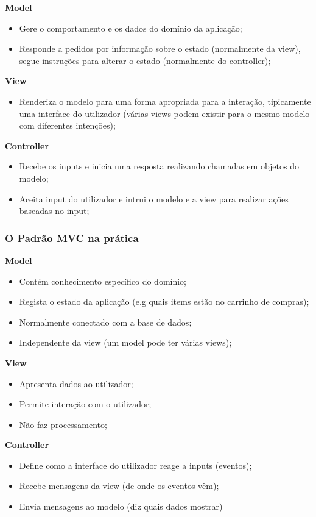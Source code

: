 \documentclass{article}
\begin{document}
\begin{flushleft}
  \textbf{Model}
  \begin{itemize}
    \item Gere o comportamento e os dados do domínio da aplicação;
    \item Responde a pedidos por informação sobre o estado (normalmente da view),
    segue instruções para alterar o estado (normalmente do controller);
  \end{itemize}

  \textbf{View}
  \begin{itemize}
    \item Renderiza o modelo para uma forma apropriada para a interação,
    tipicamente uma interface do utilizador (várias views podem existir para o mesmo modelo
    com diferentes intenções);
  \end{itemize}

  \textbf{Controller}
  \begin{itemize}
    \item Recebe os inputs e inicia uma resposta realizando chamadas em objetos do modelo;
    \item Aceita input do utilizador e intrui o modelo e a view para realizar ações baseadas no input;
  \end{itemize}
\end{flushleft}


\subsubsection{O Padrão MVC na prática}

\begin{flushleft}
  \textbf{Model}
  \begin{itemize}
    \item Contém conhecimento específico do domínio;
    \item Regista o estado da aplicação (e.g quais items estão no carrinho de compras);
    \item Normalmente conectado com a base de dados;
    \item Independente da view (um model pode ter várias views);
  \end{itemize}

  \textbf{View}
  \begin{itemize}
    \item Apresenta dados ao utilizador;
    \item Permite interação com o utilizador;
    \item Não faz processamento;
  \end{itemize}
    
  \textbf{Controller}
  \begin{itemize}
    \item Define como a interface do utilizador reage a inputs (eventos);
    \item Recebe mensagens da view (de onde os eventos vêm);
    \item Envia mensagens ao modelo (diz quais dados mostrar)
  \end{itemize}
\end{flushleft}
\end{document}
